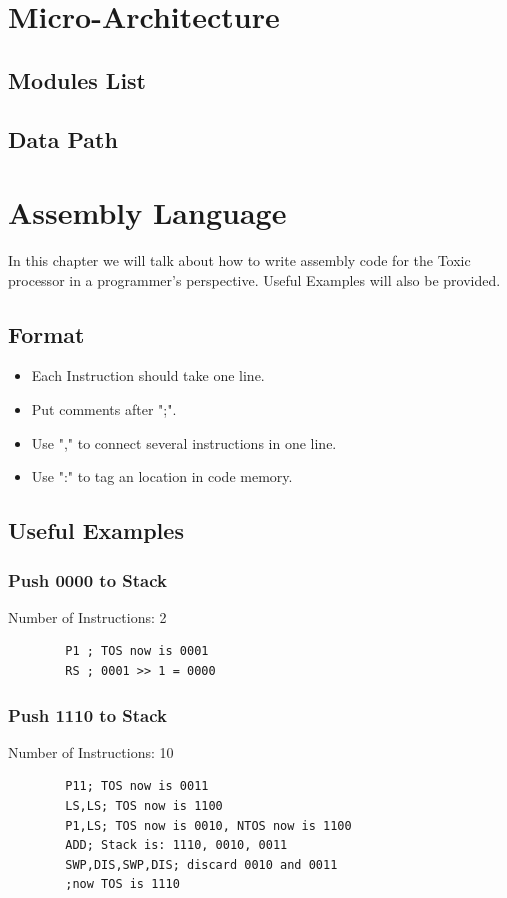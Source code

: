 \documentclass[11pt]{report}
\begin{document}
    \chapter{Micro-Architecture}
    \label{chapter:implementation}
    \section{Modules List}
    \section{Data Path}

    \chapter{Assembly Language}
    In this chapter we will talk about how to write assembly code for the Toxic processor
    in a programmer's perspective. Useful Examples will also be provided.
    \section{Format}
    \begin{itemize}
        \item Each Instruction should take one line.
        \item Put comments after ";".
        \item Use "," to connect several instructions in one line.
        \item Use ":" to tag an location in code memory.
    \end{itemize}
    
    \section{Useful Examples}
    \subsection{Push 0000 to Stack}
    Number of Instructions: 2
    \begin{verbatim}
        P1 ; TOS now is 0001
        RS ; 0001 >> 1 = 0000
    \end{verbatim}

    \subsection{Push 1110 to Stack}
    Number of Instructions: 10
    \begin{verbatim}
        P11; TOS now is 0011
        LS,LS; TOS now is 1100
        P1,LS; TOS now is 0010, NTOS now is 1100
        ADD; Stack is: 1110, 0010, 0011
        SWP,DIS,SWP,DIS; discard 0010 and 0011
        ;now TOS is 1110
    \end{verbatim}
\end{document}
